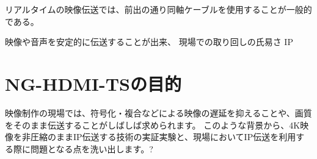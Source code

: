 リアルタイムの映像伝送では、前出の通り同軸ケーブルを使用することが一般的である。

映像や音声を安定的に伝送することが出来、
現場での取り回しの氏易さ
IP


\section{NG-HDMI-TSの目的}

映像制作の現場では、符号化・複合などによる映像の遅延を抑えることや、画質をそのまま伝送することがしばしば求められます。
このような背景から、4K映像を非圧縮のままIP伝送する技術の実証実験と、現場においてIP伝送を利用する際に問題となる点を洗い出します。?


